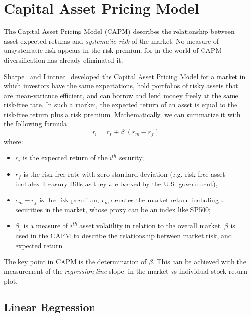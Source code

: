 \section{Capital Asset Pricing Model}
\label{sec:capm}
The Capital Asset Pricing Model (CAPM) describes the relationship between asset expected returns and \emph{systematic risk} of the market. No measure of unsystematic risk appears in the risk premium for in the world of CAPM diversification has already eliminated it.

Sharpe~\cite{bib:capm_sharpe} and Lintner~\cite{bib:capm_lintner} developed the Capital Asset Pricing Model
for a market in which investors have the same expectations, hold portfolios of risky assets that are mean-variance efficient, and can borrow and lend money freely at the same risk-free rate. In such a market, the expected return of an asset is equal to the risk-free return plus a risk premium.
Mathematically, we can summarize it with the following formula
\begin{equation}
r_i = r_f + \beta_i(r_m-r_f)
\label{eq:capm}
\end{equation}
where:
\begin{itemize}
\item $r_i$ is the expected return of the $i^{th}$ security;
\item $r_f$ is the risk-free rate with zero standard deviation (e.g. risk-free asset includes Treasury Bills as they are backed by the U.S. government);
\item $r_m - r_f$ is the risk premium, $r_m$ denotes the market return including all securities in the market, whose proxy can be an index like SP500;
\item $\beta_i$ is a measure of $i^{th}$ asset volatility in relation to the overall market. $\beta$ is used in the CAPM to describe the relationship between market risk, and expected return.
\end{itemize}
	
The key point in CAPM is the determination of $\beta$. This can be achieved with the measurement of the \emph{regression line} slope, in the market vs individual stock return plot.

\subsection{Linear Regression}


